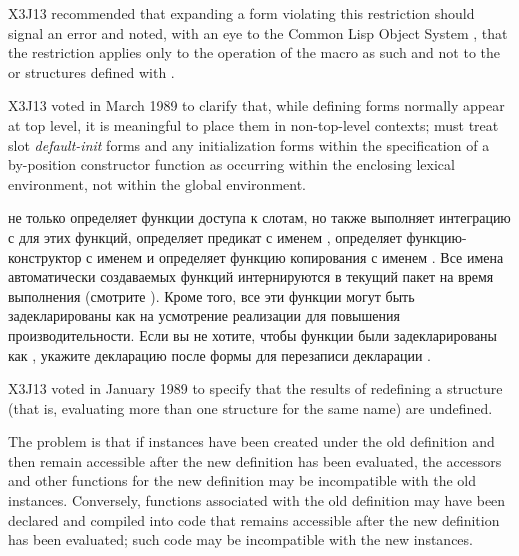 \begin{defmac}
\begin{new}
X3J13 recommended that expanding
a  form violating this
restriction should signal an error and noted, with an eye to the Common Lisp
Object System
, that the restriction applies only to the operation of the
 macro as such and not to the  or
structures defined with .
\end{new}

\begin{newer}
X3J13 voted in March 1989 
to clarify that, while defining forms normally appear at top level,
it is meaningful to place them in non-top-level contexts;
 must treat slot \emph{default-init} forms
and any
initialization forms within the specification of a by-position
constructor function as occurring
within the enclosing lexical environment, not within the global
environment.
\end{newer}

 не только определяет функции доступа к слотам, но также
выполняет интеграцию с  для этих функций, определяет предикат с
именем , определяет функцию-конструктор с именем
 и определяет функцию копирования с именем
.
Все имена автоматически создаваемых функций интернируются в текущий пакет на время
выполнения  (смотрите ).
Кроме того, все эти функции могут быть задекларированы как  на
усмотрение реализации для повышения производительности.
Если вы не хотите, чтобы функции были задекларированы как , укажите
декларацию  после формы  для перезаписи декларации
.

\begin{newer}
X3J13 voted in January 1989 
to specify that the results of redefining a  structure
(that is, evaluating more than one  structure
for the same name) are undefined.

The problem is that if instances have been created under the old definition
and then remain accessible after the new definition has been evaluated,
the accessors and other functions for the new definition may be incompatible
with the old instances.  Conversely, functions associated with the
old definition may have been declared  and compiled
into code that remains accessible after the new definition has been
evaluated; such code may be incompatible with the new instances.


\end{newer}
\end{defmac}

